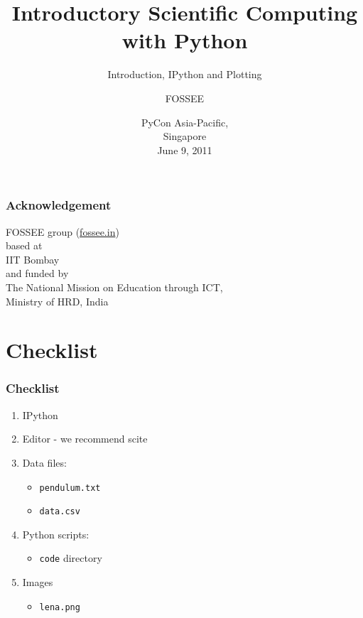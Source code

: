\documentclass[14pt,compress]{beamer}
\title[Interactive Plotting]{Introductory Scientific Computing with
Python}
\subtitle{Introduction, IPython and Plotting}
\author[FOSSEE group] {FOSSEE}
\institute[IIT Bombay] {Department of Aerospace Engineering\\IIT Bombay}
\date[] {PyCon Asia-Pacific,\\
Singapore\\
June 9, 2011
}
\newcommand{\typ}[1]{\lstinline{#1}}
\begin{document}
\begin{frame}
  \maketitle
\end{frame}


\begin{frame}
    \frametitle{Acknowledgement}
    \Large
    \begin{center}
        \alert{FOSSEE group (\url{fossee.in})} \\
        based at\\ 
        \alert{IIT Bombay}\\
        and funded by\\
        The National Mission on Education through ICT, \\
        \alert{Ministry of HRD, India}
    \end{center}
\end{frame}

\section{Checklist}
\begin{frame}
\frametitle{Checklist}
  \begin{enumerate}
    \item IPython
    \item Editor - we recommend \alert{scite}
    \item Data files: 
      \begin{itemize}
      \item \typ{pendulum.txt}
      \item \typ{data.csv}
      \end{itemize}
    \item Python scripts: 
      \begin{itemize}
          \item \typ{code} directory
      \end{itemize}
    \item Images
      \begin{itemize}
      \item \typ{lena.png}
      \end{itemize}
  \end{enumerate}
\end{frame}
\end{document}
